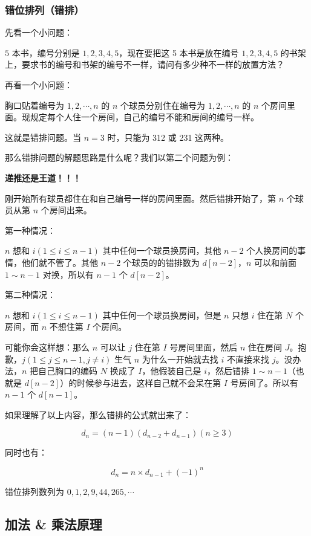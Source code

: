 \subsubsection{错位排列（错排）}

先看一个小问题：  

$5$ 本书，编号分别是 $1,2,3,4,5$，现在要把这 5 本书是放在编号 $1,2,3,4,5$ 的书架上，要求书的编号和书架的编号不一样，请问有多少种不一样的放置方法？

再看一个小问题：  

胸口贴着编号为 $1,2,\cdots,n$ 的 $n$ 个球员分别住在编号为 $1,2,\cdots,n$ 的 $n$ 个房间里面。现规定每个人住一个房间，自己的编号不能和房间的编号一样。

这就是错排问题。当 $n=3$ 时，只能为 312 或 231 这两种。

那么错排问题的解题思路是什么呢？我们以第二个问题为例：

\textbf{ 递推还是王道！！！}

刚开始所有球员都住在和自己编号一样的房间里面。然后错排开始了，第 $n$ 个球员从第 $n$ 个房间出来。

第一种情况：  

$n$ 想和 $i(1 \le i \le n-1)$ 其中任何一个球员换房间，其他 $n-2$ 个人换房间的事情，他们就不管了。其他 $n-2$ 个球员的的错排数为 $d[n-2]$，$n$ 可以和前面 $1 \sim n-1$ 对换，所以有 $n-1$ 个 $d[n-2]$。

第二种情况：  

$n$ 想和 $i(1 \le i \le n-1)$ 其中任何一个球员换房间，但是 $n$ 只想 $i$ 住在第 $N$ 个房间，而 $n$ 不想住第 $I$ 个房间。

可能你会这样想：那么 $n$ 可以让 $j$ 住在第 $I$ 号房间里面，然后 $n$ 住在房间 $J$。抱歉，$j(1 \le j \le n-1,j\neq i)$ 生气 $n$ 为什么一开始就去找 $i$ 不直接来找 $j$。没办法，$n$ 把自己胸口的编码 $N$ 换成了 $I$，他假装自己是 $i$，然后错排 $1 \sim n-1$（也就是 $d[n-2]$）的时候参与进去，这样自己就不会呆在第 $I$ 号房间了。所以有 $n-1$ 个 $d[n-1]$。

如果理解了以上内容，那么错排的公式就出来了：

$$
d_n = (n-1)(d_{n-2} + d_{n-1}) (n\geq 3)
$$

同时也有：

$$
d_n = n \times d_{n-1} + (-1)^n
$$

错位排列数列为 $0,1,2,9,44,265,\cdots$

\subsection{加法 \& 乘法原理}

